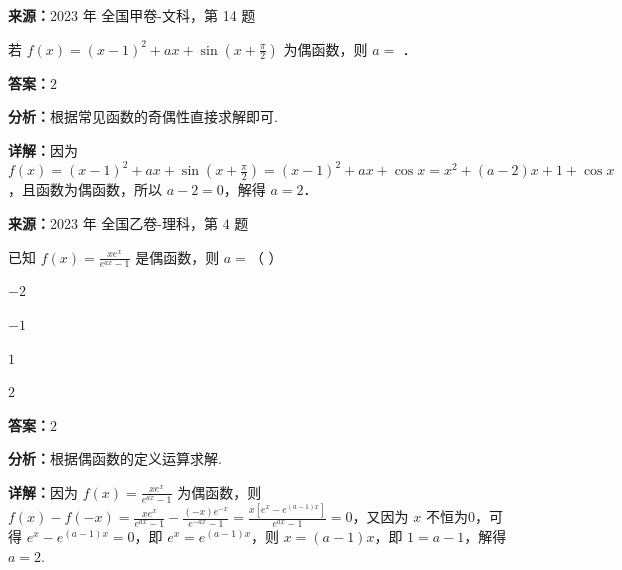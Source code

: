 \begin{question}[points=5]
\textbf{来源：}2023 年 全国甲卷-文科，第 14 题\par
若 $f(x)=(x-1)^2+ax+\sin\left(x+\frac{\pi}{2}\right)$ 为偶函数，则 $a=$ ．
\fillin[{$2$}]
\begin{solution}
\textbf{答案：}$2$

\textbf{分析：}根据常见函数的奇偶性直接求解即可.

\textbf{详解：}因为 $f(x)=(x-1)^2+ax+\sin\left(x+\frac{\pi}{2}\right) = (x-1)^2+ax+\cos x = x^2+(a-2)x+1+\cos x$，且函数为偶函数，所以 $a-2=0$，解得 $a=2$．
\end{solution}
\end{question}

\begin{question}[points=5]
\textbf{来源：}2023 年 全国乙卷-理科，第 4 题\par
已知 $f(x)=\frac{xe^x}{e^{ax}-1}$ 是偶函数，则 $a=$（ ）
\begin{choices}
  \item $-2$
  \item $-1$
  \item $1$
  \item $2$
\end{choices}
\begin{solution}
\textbf{答案：}$2$

\textbf{分析：}根据偶函数的定义运算求解.

\textbf{详解：}因为 $f(x)=\frac{xe^x}{e^{ax}-1}$ 为偶函数，则 $f(x)-f(-x)=\frac{xe^x}{e^{ax}-1}-\frac{(-x)e^{-x}}{e^{-ax}-1}=\frac{x[e^x-e^{(a-1)x}]}{e^{ax}-1}=0$，又因为 $x$ 不恒为0，可得 $e^x-e^{(a-1)x}=0$，即 $e^x=e^{(a-1)x}$，则 $x=(a-1)x$，即 $1=a-1$，解得 $a=2$.
\end{solution}
\end{question}

